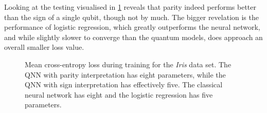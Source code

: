 Looking at the testing visualised in \cref{fig:iris_training_lr} reveals that parity indeed performs better than the sign of a single qubit, though not by much.
The bigger revelation is the performance of logistic regression, which greatly outperforms the neural network, and while slightly slower to converge than the quantum models, does approach an overall smaller loss value.

\begin{figure}
    \centering
    \caption{
        Mean cross-entropy loss during training for the \textit{Iris} data set.
        The QNN with parity interpretation has eight parameters, while the QNN with sign interpretation has effectively five.
        The classical neural network has eight and the logistic regression has five parameters.
    }
    \label{fig:iris_training_lr}
\end{figure}
